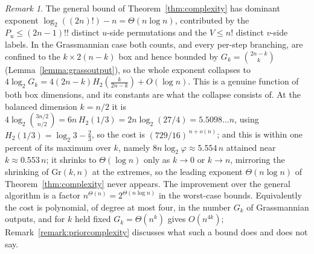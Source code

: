 \documentclass{amsart}
\theoremstyle{definition}
\theoremstyle{remark}
\newtheorem{remark}[lemma]{Remark}
\numberwithin{equation}{section}
\begin{document}
\begin{remark}
The general bound of Theorem~\ref{thm:complexity} has dominant exponent $\log_2((2n)!)-n=\Theta(n\log n)$, contributed by the $P_u\leq(2n-1)!!$ distinct $u$-side permutations and the $V\leq n!$ distinct $v$-side labels. In the Grassmannian case both counts, and every per-step branching, are confined to the $k\times 2(n-k)$ box and hence bounded by $G_k=\binom{2n-k}{k}$ (Lemma~\ref{lemma:grassoutput}), so the whole exponent collapses to $4\log_2 G_k=4(2n-k)H_2\!\left(\frac{k}{2n-k}\right)+O(\log n)$. This is a genuine function of both box dimensions, and its constants are what the collapse consists of. At the balanced dimension $k=n/2$ it is $4\log_2\binom{3n/2}{n/2}=6n\,H_2(1/3)=2n\log_2(27/4)=5.5098\ldots n$, using $H_2(1/3)=\log_2 3-\tfrac23$, so the cost is $(729/16)^{\,n+o(n)}$; and this is within one percent of its maximum over $k$, namely $8n\log_2\varphi\approx 5.554\,n$ attained near $k\approx 0.553\,n$; it shrinks to $\Theta(\log n)$ only as $k\to 0$ or $k\to n$, mirroring the shrinking of $\mathrm{Gr}(k,n)$ at the extremes, so the leading exponent $\Theta(n\log n)$ of Theorem~\ref{thm:complexity} never appears. The improvement over the general algorithm is a factor $n^{\Theta(n)}=2^{\Theta(n\log n)}$ in the worst-case bounds. Equivalently the cost is polynomial, of degree at most four, in the number $G_k$ of Grassmannian outputs, and for $k$ held fixed $G_k=\Theta(n^k)$ gives $O(n^{4k})$; Remark~\ref{remark:priorcomplexity} discusses what such a bound does and does not say.
\end{remark}
\end{document}
